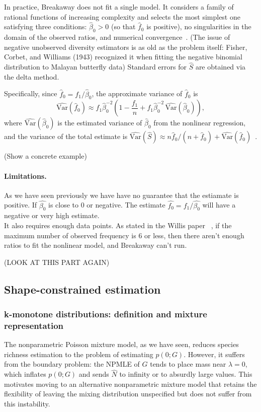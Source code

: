 \documentclass{article}
\begin{document}
{In practice, Breakaway does not fit a single model. It considers a family of rational functions of increasing complexity and selects the most simplest one satisfying three conditions: $\hat{\beta}_0 > 0$ (so that $\hat{f}_0$ is positive), no singularities in the domain of the observed ratios, and numerical convergence~\cite{willisbunge2015}. (The issue of negative unobserved diversity estimators is as old as the problem itself: Fisher, Corbet, and Williams (1943) recognized it when fitting the negative binomial distribution to Malayan butterfly data)
Standard errors for $\hat{S}$ are obtained via the delta method. 

Specifically, since $\hat{f}_0 = f_1 / \hat{\beta}_0$, the approximate
variance of $\hat{f}_0$ is
\[
\widehat{\mathrm{Var}}(\hat{f}_0)
\approx f_1 \hat{\beta}_0^{-2}
\left(1 - \frac{f_1}{n} + f_1 \hat{\beta}_0^{-2}\,
\widehat{\mathrm{Var}}(\hat{\beta}_0)\right),
\]
where $\widehat{\mathrm{Var}}(\hat{\beta}_0)$ is the estimated variance
of $\hat{\beta}_0$ from the nonlinear regression, and the variance of
the total estimate is $\widehat{\mathrm{Var}}(\hat{S}) \approx
n\hat{f}_0 / (n + \hat{f}_0) +
\widehat{\mathrm{Var}}(\hat{f}_0)$~\cite{willisbunge2015}.

(Show a concrete example)

\paragraph{Limitations.}
As we have seen previously we have have no guarantee that the estiamate is positive. If $\hat{\beta_0}$ is close to 0 or negative. The estimate $\hat{f_0} = f_1/\hat{\beta_0}$ will have a negative or very high estimate.\\
It also requires enough data points. As stated in the Willis paper ~\cite{willisbunge2015}, if the maximum number of observed frequency is 6 or less, then there aren't enough ratios to fit the nonlinear model, and Breakaway can't run.

(LOOK AT THIS PART AGAIN)
\subsection{Shape-constrained estimation}

\subsubsection{k-monotone distributions: definition and mixture representation}
The nonparametric Poisson mixture model, as we have seen, reduces species richness estimation to the problem of estimating $p(0;G)$. However, it suffers from the boundary problem: the NPMLE of $G$ tends to place mass near $\lambda = 0$, which inflates $p(0;G)$ and sends $\hat{N}$ to infinity or to absurdly large values. This motivates moving to an alternative nonparametric mixture model that retains the flexibility of leaving the mixing distribution unspecified but does not suffer from this instability.

}
\end{document}
